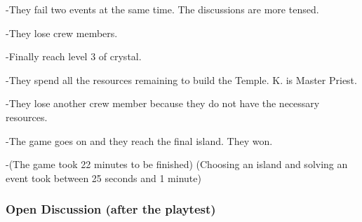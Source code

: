\documentclass[a4paper,11pt]{report}
\begin{document}
-They fail two events at the same time. The discussions are more tensed. 

-They lose crew members. 

-Finally reach level 3 of crystal.

-They spend all the resources remaining to build  the Temple. K. is Master Priest.

-They lose another crew member because they do not have the necessary resources.

-The game goes on and they reach the final island. They won.

-(The game took 22 minutes to be finished) (Choosing an island and solving an event took between 25 seconds and 1 minute)

\subsubsection{Open Discussion (after the playtest)}
\end{document}
